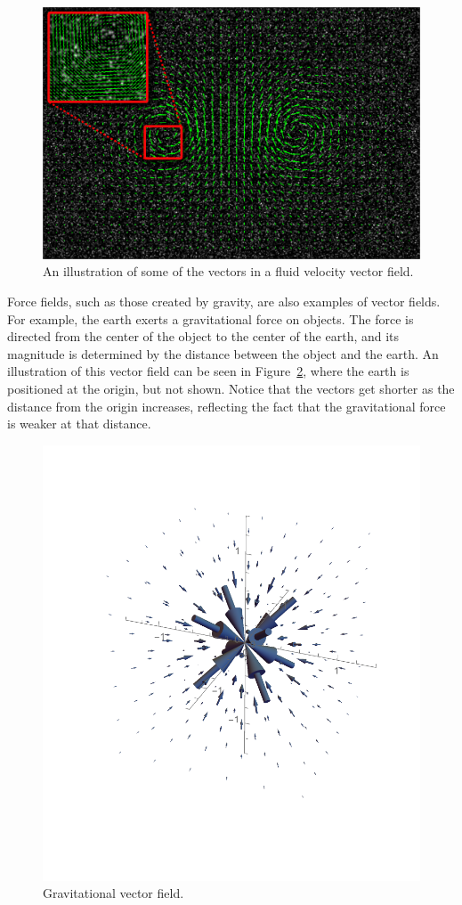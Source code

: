\begin{figure}[h]
  \centering
  \includegraphics[width=0.9\linewidth]{figures/12_1_PIVlab_multipass.jpg}

  \caption{An illustration of some of the vectors in a fluid velocity
    vector field.}
  \label{fig:12.1.fluid-velocity}
\end{figure}

Force fields, such as those created by gravity, are also examples of
vector fields. For example, the earth exerts a gravitational force on
objects. The force is directed from the center of the object to the
center of the earth, and its magnitude is determined by the distance
between the object and the earth. An illustration of this vector field
can be seen in Figure~\ref{fig:12.1.gravity}, where the earth is
positioned at the origin, but not shown. Notice that the vectors get
shorter as the distance from the origin increases, reflecting the fact
that the gravitational force is weaker at that distance.

\begin{figure}[h]
  \centering
  \includegraphics[width=0.4\linewidth]{figures/12_1_gravity_field.pdf}
  \caption{Gravitational vector field.}
  \label{fig:12.1.gravity}
\end{figure}

